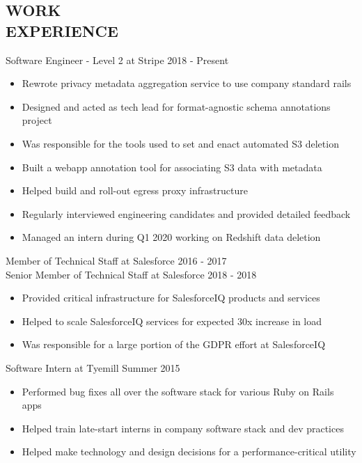 \documentclass[line,margin]{res}
\begin{document}
\begin{resume}
\section{\textcolor{HeaderColor}{WORK \\ EXPERIENCE}} 
	      {\sc Software Engineer - Level 2 at Stripe} \hfill 2018 - Present
                 \begin{itemize}  \itemsep -2pt %
	             \item Rewrote privacy metadata aggregation service to use company standard rails
                 \item Designed and acted as tech lead for format-agnostic schema annotations project
                 \item Was responsible for the tools used to set and enact automated S3 deletion
                 \item Built a webapp annotation tool for associating S3 data with metadata
                 \item Helped build and roll-out egress proxy infrastructure
                 \item Regularly interviewed engineering candidates and provided detailed feedback
                 \item Managed an intern during Q1 2020 working on Redshift data deletion
                 \end{itemize}

	      {\sc Member of Technical Staff at Salesforce} \hfill 2016 - 2017 \\
	      {\sc Senior Member of Technical Staff at Salesforce} \hfill 2018 - 2018
                 \begin{itemize}  \itemsep -2pt %
	             \item Provided critical infrastructure for SalesforceIQ products and services
                 \item Helped to scale SalesforceIQ services for expected 30x increase in load
                 \item Was responsible for a large portion of the GDPR effort at SalesforceIQ
                 \end{itemize}

                {\sc Software Intern at Tyemill} \hfill Summer 2015
                 \begin{itemize}  \itemsep -2pt %
                 \item Performed bug fixes all over the software stack for various Ruby on Rails apps
	      \item Helped train late-start interns in company software stack and dev practices
	      \item Helped make technology and design decisions for a performance-critical utility
                 \end{itemize}


\end{resume}
\end{document}
